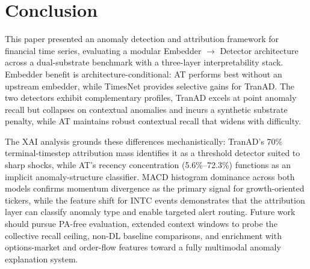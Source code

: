 \documentclass{llncs}
\begin{document}
\section{Conclusion}

This paper presented an anomaly detection and attribution framework for financial time series, evaluating a modular Embedder $\rightarrow$ Detector architecture across a dual-substrate benchmark with a three-layer interpretability stack. Embedder benefit is architecture-conditional: AT performs best without an upstream embedder, while TimesNet provides selective gains for TranAD. The two detectors exhibit complementary profiles, TranAD excels at point anomaly recall but collapses on contextual anomalies and incurs a synthetic substrate penalty, while AT maintains robust contextual recall that widens with difficulty.

The XAI analysis grounds these differences mechanistically: TranAD's 70\% terminal-timestep attribution mass identifies it as a threshold detector suited to sharp shocks, while AT's recency concentration (5.6\%--72.3\%) functions as an implicit anomaly-structure classifier. MACD histogram dominance across both models confirms momentum divergence as the primary signal for growth-oriented tickers, while the feature shift for INTC events demonstrates that the attribution layer can classify anomaly type and enable targeted alert routing. Future work should pursue PA-free evaluation, extended context windows to probe the collective recall ceiling, non-DL baseline comparisons, and enrichment with options-market and order-flow features toward a fully multimodal anomaly explanation system.
\end{document}
